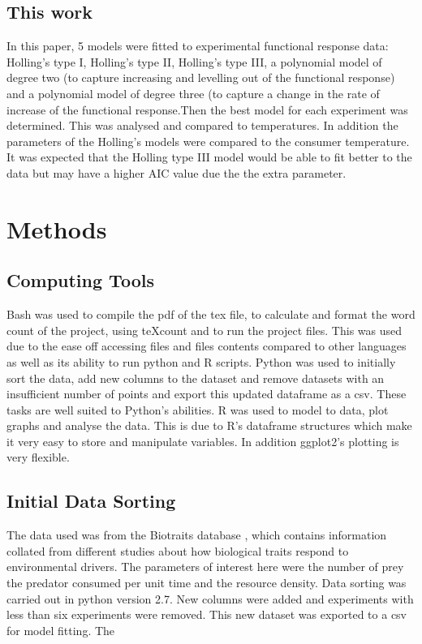 \documentclass{article}
\begin{document}
\subsection{This work}
In this paper, 5 models were fitted to experimental functional response data: Holling's type I, Holling's type II, Holling's type III, a polynomial model of degree two (to capture increasing and levelling out of the functional response) and a polynomial model of degree three (to capture a change in the rate of increase of the functional response.Then the best model for each experiment was determined. This was analysed and compared to temperatures. In addition the parameters of the Holling's models were compared to the consumer temperature.\\
It was expected that the Holling type III model would be able to fit better to the data but may have a higher AIC value due the the extra parameter. %
%
\section{Methods}
\subsection{Computing Tools}
Bash was used to compile the pdf of the tex file, to calculate and format the word count of the project, using teXcount and to run the project files. This was used due to the ease off accessing files and files contents compared to other languages as well as its ability to run python and R scripts.
Python was used to initially sort the data, add new columns to the dataset and remove datasets with an insufficient number of points and export this updated dataframe as a csv. These tasks are well suited to Python's abilities.
R was used to model to data, plot graphs and analyse the data. This is due to R's dataframe structures which make it very easy to store and manipulate variables. In addition ggplot2's plotting is very flexible.
\subsection{Initial Data Sorting}
The data used was from the Biotraits database \cite{Dell2013}, which contains information collated from different studies about how biological traits respond to environmental drivers. The parameters of interest here were the number of prey the predator consumed per unit time and the resource density. Data sorting was carried out in python version 2.7. New columns were added and experiments with less than six experiments were removed. This new dataset was exported to a csv for model fitting. The
\end{document}
